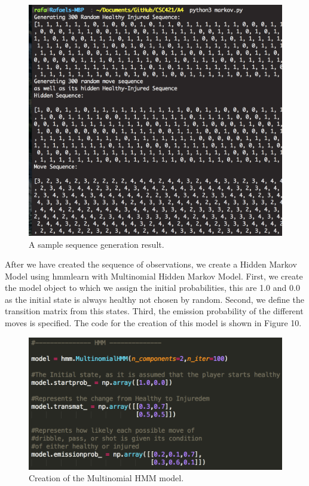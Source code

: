 \documentclass[12pt, letter]{article}
\begin{document}
 \begin{figure}[htb]
  \centering
  \includegraphics[width=0.80 \textwidth]{./figures/sequence_example.png}
  \caption{A sample sequence generation result.}
\end{figure}

\FloatBarrier

After we have created the sequence of observations, we create a Hidden Markov Model using hmmlearn with Multinomial Hidden Markov Model. First, we create the model object to which we assign the initial probabilities, this are 1.0 and 0.0 as the initial state is always healthy not chosen by random. Second, we define the transition matrix from this states. Third, the emission probability of the different moves is specified. The code for the creation of this model is shown in Figure 10.

 \begin{figure}[htb]
  \centering
  \includegraphics[width=0.70 \textwidth]{./figures/hmm_creation.png}
  \caption{Creation of the Multinomial HMM model.}
\end{figure}

\FloatBarrier
\end{document}
